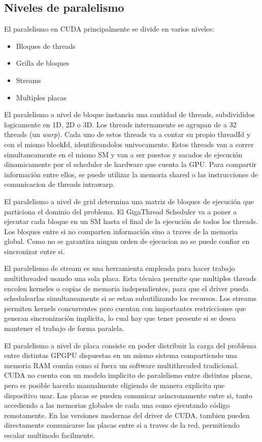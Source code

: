 \subsection{Niveles de paralelismo}
El paralelismo en CUDA principalmente se divide en varios niveles:
\begin{itemize}
  \item Bloques de threads
  \item Grilla de bloques
  \item Streams
  \item Multiples placas
\end{itemize}

El paralelismo a nivel de bloque instancia una cantidad de threads, subdivididos logicamente en 1D, 2D o 3D.
Los threads internamente se agrupan de a 32 threads (un \textit{warp}).
Cada uno de estos threads va a contar su propio threadId y con el mismo blockId, identificandolos univocamente.
Estos threads van a correr simultaneamente en el mismo SM y van a ser puestos y sacados de ejecuci\'on
dinamicamente por el scheduler de hardware que cuenta la GPU. Para compartir informaci\'on entre
ellos, se puede utilizar la memoria shared o las instrucciones de comunicacion de threads intrawarp.

El paralelismo a nivel de grid determina una matriz de bloques de ejecuci\'on que particiona
el dominio del problema. El GigaThread Scheduler va a poner a ejecutar cada bloque en un SM hasta
el final de la ejecuci\'on de todos los threads. Los bloques entre si no comparten informaci\'on
sino a traves de la memoria global. Como no se garantiza ningun orden de ejecucion no se puede
confiar en sincronizar entre si.

El paralelismo de stream es una herramienta empleada para hacer trabajo multithreaded usando una
sola placa. Esta t\'ecnica permite que multiples threads encolen kerneles o copias de memoria
independientes, para que el driver pueda schedulearlas simultaneamente si se estan subutilizando
los recursos. Los streams permiten kernels concurrentes pero cuentan con importantes restricciones
que generan sincronizaci\'on implicita, lo cual hay que tener presente si se desea mantener el trabajo
de forma paralela.

El paralelismo a nivel de placa consiste en poder distribuir la carga del problema entre distintas
GPGPU dispuestas en un mismo sistema compartiendo una memoria RAM com\'un como si fuera un software
multithreaded tradicional. CUDA no cuenta con un modelo implicito de paralelismo entre distintas placas,
pero es posible hacerlo manualmente eligiendo de manera explicita que dispositivo usar. Las placas
se pueden comunicar asincronamente entre si, tanto accediendo a las memorias globales de cada una
como ejecutando c\'odigo remotamente. En las versiones modernas del driver de CUDA, tambien pueden
directamente comunicarse las placas entre si a traves de la red, permitiendo escalar multinodo facilmente.

